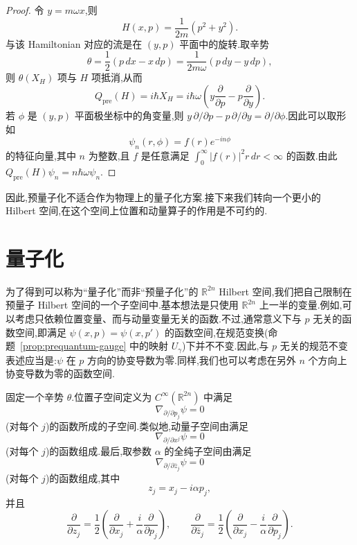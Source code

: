\begin{proof}
令 $y=m\omega x$,则
\[
 H(x,p)=\frac{1}{2m}(p^2+y^2).
\]
与该 Hamiltonian 对应的流是在 $(y,p)$ 平面中的旋转.取辛势
\[
 \theta=\frac12(p\,dx-x\,dp)
 =\frac{1}{2m\omega}(p\,dy-y\,dp),
\]
则 $\theta(X_H)$ 项与 $H$ 项抵消,从而
\[
 Q_{\mathrm{pre}}(H)=i\hbar X_H
 =i\hbar\omega\left(y\frac{\partial}{\partial p}-p\frac{\partial}{\partial y}\right).
\]
若 $\phi$ 是 $(y,p)$ 平面极坐标中的角变量,则
$y\,\partial/\partial p-p\,\partial/\partial y=\partial/\partial\phi$.因此可以取形如
\[
 \psi_n(r,\phi)=f(r)e^{-in\phi}
\]
的特征向量,其中 $n$ 为整数,且 $f$ 是任意满足
$\int_0^\infty |f(r)|^2r\,dr<\infty$ 的函数.由此
$Q_{\mathrm{pre}}(H)\psi_n=n\hbar\omega\psi_n$.
\end{proof}

因此,预量子化不适合作为物理上的量子化方案.接下来我们转向一个更小的 Hilbert 空间,在这个空间上位置和动量算子的作用是不可约的.

\section{量子化}
\label{sec:geometric-quantization-euclidean-quantization}

为了得到可以称为“量子化”而非“预量子化”的 $\mathbb R^{2n}$ Hilbert 空间,我们把自己限制在预量子 Hilbert 空间的一个子空间中.基本想法是只使用 $\mathbb R^{2n}$ 上一半的变量.例如,可以考虑只依赖位置变量、而与动量变量无关的函数.不过,通常意义下与 $p$ 无关的函数空间,即满足 $\psi(x,p)=\psi(x,p')$ 的函数空间,在规范变换(命题~\ref{prop:prequantum-gauge} 中的映射 $U_\gamma$)下并不不变.因此,与 $p$ 无关的规范不变表述应当是:$\psi$ 在 $p$ 方向的协变导数为零.同样,我们也可以考虑在另外 $n$ 个方向上协变导数为零的函数空间.

\begin{definition}[位置、动量与全纯子空间]
\label{def:quantum-polarizations-euclidean}
固定一个辛势 $\theta$.位置子空间定义为 $C^\infty(\mathbb R^{2n})$ 中满足
\[
 \nabla_{\partial/\partial p_j}\psi=0
\]
(对每个 $j$)的函数所成的子空间.类似地,动量子空间由满足
\[
 \nabla_{\partial/\partial x^j}\psi=0
\]
(对每个 $j$)的函数组成.最后,取参数 $\alpha$ 的全纯子空间由满足
\[
 \nabla_{\partial/\partial\bar z_j}\psi=0
\]
(对每个 $j$)的函数组成,其中
\[
 z_j=x_j-i\alpha p_j,
\]
并且
\[
 \frac{\partial}{\partial z_j}
 =\frac12\left(\frac{\partial}{\partial x_j}
 +\frac{i}{\alpha}\frac{\partial}{\partial p_j}\right),
 \qquad
 \frac{\partial}{\partial\bar z_j}
 =\frac12\left(\frac{\partial}{\partial x_j}
 -\frac{i}{\alpha}\frac{\partial}{\partial p_j}\right).
 \label{eq:holomorphic-coordinates}
\]
\end{definition}

